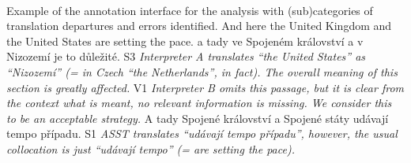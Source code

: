 \documentclass[output=paper]{langscibook}
\begin{document}
%


\ \ \\
Example of the annotation interface for the analysis with (sub)categories of translation departures and errors identified.
\ea 
  \ea
    \ea   And here the United Kingdom and the United States are setting the pace.
    \ex   a tady ve Spojeném království a v Nizozemí je to důležité.
    \ex   S3
    \ex   \textit{Interpreter A translates “the United States” as “Nizozemí” (= in Czech “the Netherlands”, in fact). The overall meaning of this section is greatly affected.}
    \z
  \ex
    \ea
    \ex   V1
    \ex   \textit{Interpreter B omits this passage, but it is clear from the context what is meant, no relevant information is missing. We consider this to be an acceptable strategy.}
    \z
  \ex
    \ea   A tady Spojené království a Spojené státy udávají tempo případu.
    \ex   S1
    \ex   \textit{ASST translates “udávají tempo případu”, however, the usual collocation is just “udávají tempo” (= are setting the pace).}
    \z
  \z
\z
\end{document}
